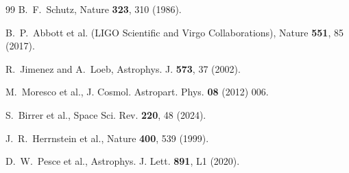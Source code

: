 \documentclass[aps,prd,twocolumn,10pt,superscriptaddress,nofootinbib]{revtex4-2}
\begin{document}
\begin{thebibliography}{99}
B.~F.~Schutz,
Nature \textbf{323}, 310 (1986).

B.~P.~Abbott et al. (LIGO Scientific and Virgo Collaborations),
Nature \textbf{551}, 85 (2017).

R.~Jimenez and A.~Loeb,
Astrophys. J. \textbf{573}, 37 (2002).

M.~Moresco et al.,
J. Cosmol. Astropart. Phys. \textbf{08} (2012) 006.

S.~Birrer et al.,
Space Sci. Rev. \textbf{220}, 48 (2024).

J.~R.~Herrnstein et al.,
Nature \textbf{400}, 539 (1999).

D.~W.~Pesce et al.,
Astrophys. J. Lett. \textbf{891}, L1 (2020).

\end{thebibliography}
\end{document}
